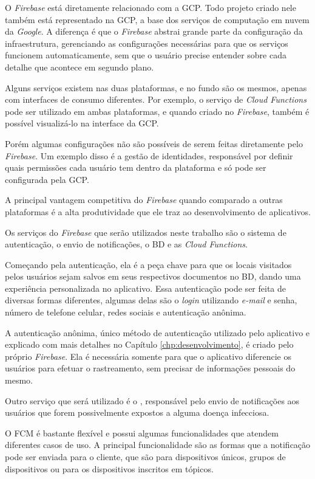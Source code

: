 O \textit{Firebase} está diretamente relacionado com a GCP. Todo projeto criado nele também está representado na GCP, a base dos serviços de computação em nuvem da \textit{Google}. A diferença é que o \textit{Firebase} abstrai grande parte da configuração da infraestrutura, gerenciando as configurações necessárias para que os serviços funcionem automaticamente, sem que o usuário precise entender sobre cada detalhe que acontece em segundo plano.

Alguns serviços existem nas duas plataformas, e no fundo são os mesmos, apenas com interfaces de consumo diferentes. Por exemplo, o serviço de \textit{Cloud Functions} pode ser utilizado em ambas plataformas, e quando criado no \textit{Firebase}, também é possível visualizá-lo na interface da GCP.

Porém algumas configurações não são possíveis de serem feitas diretamente pelo \textit{Firebase}. Um exemplo disso é a gestão de identidades, responsável por definir quais permissões cada usuário tem dentro da plataforma e só pode ser configurada pela GCP.

A principal vantagem competitiva do \textit{Firebase} quando comparado a outras plataformas é a alta produtividade que ele traz ao desenvolvimento de aplicativos.

Os serviços do \textit{Firebase} que serão utilizados neste trabalho são o sistema de autenticação, o envio de notificações, o BD e as \textit{Cloud Functions}.

Começando pela autenticação, ela é a peça chave para que os locais visitados pelos usuários sejam salvos em seus respectivos documentos no BD, dando uma experiência personalizada no aplicativo. Essa autenticação pode ser feita de diversas formas diferentes, algumas delas são o \textit{login} utilizando \textit{e-mail} e senha, número de telefone celular, redes sociais e autenticação anônima.

A autenticação anônima, único método de autenticação utilizado pelo aplicativo e explicado com mais detalhes no Capítulo \ref{chp:desenvolvimento}, é criado pelo próprio \textit{Firebase}. Ela é necessária somente para que o aplicativo diferencie os usuários para efetuar o rastreamento, sem precisar de informações pessoais do mesmo.

Outro serviço que será utilizado é o , responsável pelo envio de notificações aos usuários que forem possivelmente expostos a alguma doença infecciosa.

O FCM é bastante flexível e possui algumas funcionalidades que atendem diferentes casos de uso. A principal funcionalidade são as formas que a notificação pode ser enviada para o cliente, que são para dispositivos únicos, grupos de dispositivos ou para os dispositivos inscritos em tópicos. 

